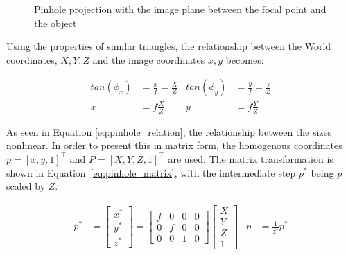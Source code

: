 \begin{figure}[!htb]

    \caption{Pinhole projection with the image plane between the focal point and the object}
    \label{fig:pinhole}
    
\end{figure}

Using the properties of similar triangles, the relationship between the World coordinates, $X,Y,Z$ and the image coordinates $x,y$ becomes:

\begin{align}
    tan(\phi_x) &= \frac{x}{f} = \frac{X}{Z} & tan(\phi_y) &= \frac{y}{f} = \frac{Y}{Z} \label{eq:pinhole_tan_relation} \\
    x &= f\frac{X}{Z} & y &=f\frac{Y}{Z}
    \label{eq:pinhole_relation}
\end{align}

As seen in Equation \eqref{eq:pinhole_relation}, the relationship between the sizes nonlinear. In order to present this in matrix form, the homogenous coordinates $p=[x,y,1]^\top$ and $P=[X,Y,Z,1]^\top$ are used. The matrix transformation is shown in Equation~\eqref{eq:pinhole_matrix}, with the imtermediate step $p^*$ being $p$ scaled by $Z$.

\begin{align}
    p^* &= \begin{bmatrix}
        x^* \\ y^* \\ z^*
    \end{bmatrix} = \begin{bmatrix}
        f & 0 & 0 & 0 \\
        0 & f & 0 & 0 \\
        0 & 0 & 1 & 0
    \end{bmatrix}\begin{bmatrix}
        X \\ Y \\ Z \\ 1
    \end{bmatrix} &
    p &= \frac{1}{z^*}p^*
    \label{eq:pinhole_matrix}
\end{align}

